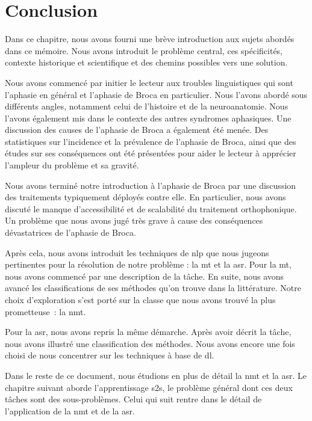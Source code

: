 \section{Conclusion}

Dans ce chapitre, nous avons fourni une brève introduction aux sujets abordés dans ce mémoire.
Nous avons introduit le problème central, ces spécificités, contexte historique et scientifique 
et des chemins possibles vers une solution.

Nous avons commencé par initier le lecteur aux troubles linguistiques qui sont 
l'aphasie en général et l'aphasie de Broca en particulier.
Nous l'avons abordé sous différents angles, notamment celui de l'histoire et de la neuroanatomie.
Nous l'avons également mis dans le contexte des autres syndromes aphasiques.
Une discussion des causes de l'aphasie de Broca a également été menée.
Des statistiques sur l'incidence et la prévalence de l'aphasie de Broca,
ainsi que des études sur ses conséquences ont été présentées
pour aider le lecteur à apprécier l'ampleur du problème et sa gravité.

Nous avons terminé notre introduction à l'aphasie de Broca 
par une discussion des traitements typiquement déployés contre elle.
En particulier, nous avons discuté le manque d'accessibilité et de scalabilité du traitement orthophonique.
Un problème que nous avons jugé très grave à cause des conséquences dévastatrices de l'aphasie de Broca.

Après cela, nous avons introduit les techniques de \gls{nlp} que nous jugeons pertinentes
pour la résolution de notre problème : la \gls{mt} et la \gls{asr}.
Pour la \gls{mt}, nous avons commencé par une description de la tâche.
En suite, nous avons avancé les classifications de ses méthodes qu'on trouve dans la littérature.
Notre choix d'exploration s'est porté sur la classe que nous avons trouvé la plus prometteuse~:
la \gls{nmt}.

Pour la \gls{asr}, nous avons repris la même démarche.
Après avoir décrit la tâche, nous avons illustré une classification des méthodes.
Nous avons encore une fois choisi de nous concentrer sur les techniques à base de \gls{dl}.

Dans le reste de ce document, nous étudions en plus de détail la \gls{nmt} et la \gls{asr}.
Le chapitre suivant aborde l'apprentissage \gls{s2s}, 
le problème général dont ces deux tâches sont des sous-problèmes.
Celui qui suit rentre dans le détail de l'application de la \gls{nmt} et de la \gls{asr}.
